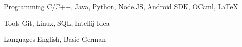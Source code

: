 

\begin{cvskills}

  \cvskill
    {Programming} %
    {C/C++, Java, Python, Node.JS, Android SDK, OCaml, LaTeX} %

  \cvskill
    {Tools} %
    {Git, Linux, SQL, Intellij Idea} %

  \cvskill
    {Languages} %
    {English, Basic German} %

\end{cvskills}
